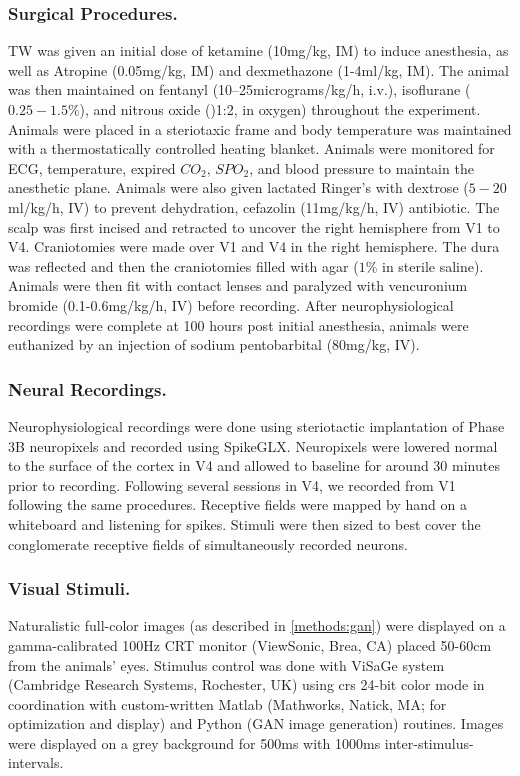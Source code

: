 \subsubsection*{Surgical Procedures.}
TW was given an initial dose of ketamine (10mg/kg, IM) to induce anesthesia, as well as Atropine (0.05mg/kg, IM) and dexmethazone (1-4ml/kg, IM). The animal was then maintained on fentanyl (10–25micrograms/kg/h, i.v.), isoflurane ($0.25-1.5\%$), and nitrous oxide ()1:2, in oxygen) throughout the experiment. Animals were placed in a steriotaxic frame and body temperature was maintained with a thermostatically controlled heating blanket. Animals were monitored for ECG, temperature, expired $CO_2$, $SPO_2$, and blood pressure to maintain the anesthetic plane. Animals were also given lactated Ringer's with dextrose ($5-20$ml/kg/h, IV) to prevent dehydration, cefazolin (11mg/kg/h, IV) antibiotic. The scalp was first incised and retracted to uncover the right hemisphere from V1 to V4. Craniotomies were made over V1 and V4 in the right hemisphere. The dura was reflected and then the craniotomies filled with agar ($1\%$ in sterile saline). Animals were then fit with contact lenses and paralyzed with vencuronium bromide (0.1-0.6mg/kg/h, IV) before recording. After neurophysiological recordings were complete at 100 hours post initial anesthesia, animals were euthanized by an injection of sodium pentobarbital (80mg/kg, IV).

\subsubsection*{Neural Recordings.}
Neurophysiological recordings were done using steriotactic implantation of Phase 3B neuropixels \parencite{Jun2017} and recorded using SpikeGLX. Neuropixels were lowered normal to the surface of the cortex in V4 and allowed to baseline for around 30 minutes prior to recording. Following several sessions in V4, we recorded from V1 following the same procedures. Receptive fields were mapped by hand on a whiteboard and listening for spikes. Stimuli were then sized to best cover the conglomerate receptive fields of simultaneously recorded neurons.

\subsubsection*{Visual Stimuli.}
Naturalistic full-color images (as described in \ref{methods:gan}) were displayed on a gamma-calibrated 100Hz CRT monitor (ViewSonic, Brea, CA) placed 50-60cm from the animals' eyes. Stimulus control was done with ViSaGe system (Cambridge Research Systems, Rochester, UK) using crs 24-bit color mode in coordination with custom-written Matlab (Mathworks, Natick, MA; for optimization and display) and Python (GAN image generation) routines. Images were displayed on a grey background for 500ms with 1000ms inter-stimulus-intervals. 

